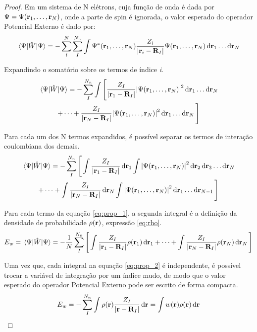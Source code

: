 \begin{proof}
	Em um sistema de N elétrons, cuja função de onda é dada por $ \Psi= \Psi(\vb{r}_1,\ldots,\vb{r}_N) $, onde a parte de spin é ignorada, o valor esperado do operador Potencial Externo é dado por:
	\begin{equation}
		\ev{\hat{W}}{\Psi}=-\sum_{i}^{N} \sum_{I}^{N_n}  \displaystyle\int \Psi^{\ast}(\vb{r}_1,\ldots,\vb{r}_N) \frac{Z_i}{\abs{\vb{r}_i-\vb{R}_I}} \Psi(\vb{r}_1,\ldots,\vb{r}_N) \dd{\vb{r}_1}\ldots\dd{\vb{r}_N}
	\end{equation}
	
	Expandindo o somatório sobre os termos de índice \textit{i}.
	\begin{multline}
		\ev{\hat{W}}{\Psi} =- \sum_{I}^{N_n} \int \Bigg[\frac{Z_I}{\abs{\vb{r}_1-\vb{R}_I}} \abs{\Psi(\vb{r}_1,\ldots,\vb{r}_N)}^{2} \dd{\vb{r}_1}\ldots\dd{\vb{r}_N} \\ + \cdots +\frac{Z_I}{\abs{\vb{r}_N-\vb{R}_I}} \abs{\Psi(\vb{r}_1,\ldots,\vb{r}_N)}^{2}  \dd{\vb{r}_1}\ldots\dd{\vb{r}_N}\Bigg] 
	\end{multline}
	
	
	Para cada um dos N termos expandidos, é possível separar os termos de interação coulombiana dos demais.
	\begin{multline}\label{eq:prop_1}
		\ev{\hat{W}}{\Psi} =- \sum_{I}^{N_n} \Bigg[ \int \frac{Z_I}{\abs{\vb{r}_1-\vb{R}_I}} \dd{\vb{r}_1}\int \abs{\Psi(\vb{r}_1,\ldots,\vb{r}_N)}^{2} \dd{\vb{r}_2}\dd{\vb{r}_3}\ldots\dd{\vb{r}_N} \\ + \cdots +\int \frac{Z_I}{\abs{\vb{r}_N-\vb{R}_I}} \dd{\vb{r}_N} \int \abs{\Psi(\vb{r}_1,\ldots,\vb{r}_N)}^{2}  \dd{\vb{r}_1}\ldots\dd{\vb{r}_{N-1}}\Bigg]
	\end{multline}
	
	Para cada termo da equação \eqref{eq:prop_1}, a segunda integral é a definição da densidade de probabilidade $ \rho(\vb{r}) $, expressão \eqref{eq:rho}. 
	\begin{equation}\label{eq:prop_2}
		E_w=\ev{\hat{W}}{\Psi} =- \frac{1}{N} \sum_{I}^{N_n} \Bigg[ \int \frac{Z_I}{\abs{\vb{r}_1-\vb{R}_I}} \rho(\vb{r}_1) \dd{\vb{r}_1} + \cdots +\int \frac{Z_I}{\abs{\vb{r}_N-\vb{R}_I}} \rho(\vb{r}_N)\dd{\vb{r}_N} \Bigg]
	\end{equation}
	
	Uma vez que, cada integral na equação \eqref{eq:prop_2} é independente, é possível trocar a variável de integração por um índice mudo, de modo que o valor esperado do operador Potencial Externo pode ser escrito de forma compacta. \cite{material_1}
	\begin{equation}
		E_w=-\sum_{I}^{N_n} \int\rho(\vb{r})\frac{Z_I}{\abs{\vb{r}-\vb{R}_I}}\dd{\vb{r}}=\int w(\vb{r})\rho(\vb{r})\dd{\vb{r}}
	\end{equation}
	
	
	
\end{proof}

